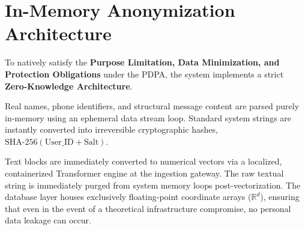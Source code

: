 \section{In-Memory Anonymization Architecture}

To natively satisfy the \textbf{Purpose Limitation, Data Minimization, and Protection Obligations} under the PDPA, the system implements a strict \textbf{Zero-Knowledge Architecture}.

Real names, phone identifiers, and structural message content are parsed purely in-memory using an ephemeral data stream loop. Standard system strings are instantly converted into irreversible cryptographic hashes, $\text{SHA-256}(\text{User\_ID} + \text{Salt})$. 

Text blocks are immediately converted to numerical vectors via a localized, containerized Transformer engine at the ingestion gateway. The raw textual string is immediately purged from system memory loops post-vectorization. The database layer houses exclusively floating-point coordinate arrays ($\mathbb{R}^d$), ensuring that even in the event of a theoretical infrastructure compromise, no personal data leakage can occur.
